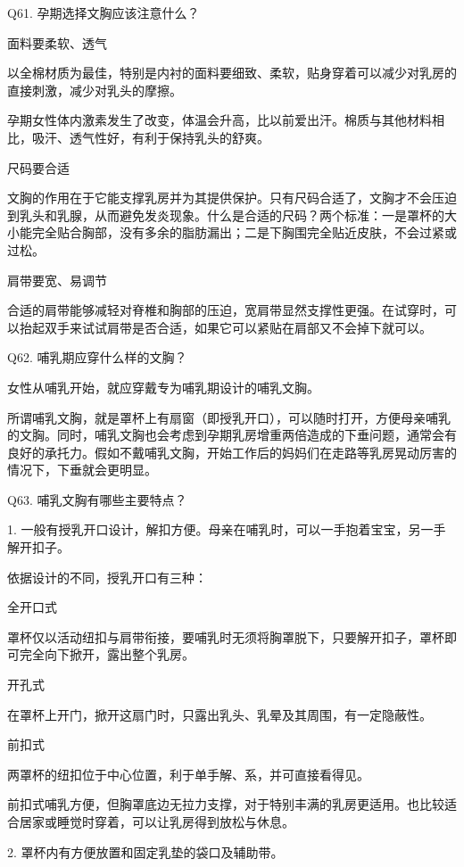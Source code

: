\documentclass[12pt,UTF8]{ctexbook}
\begin{document}
Q61. 孕期选择文胸应该注意什么？


面料要柔软、透气

以全棉材质为最佳，特别是内衬的面料要细致、柔软，贴身穿着可以减少对乳房的直接刺激，减少对乳头的摩擦。

孕期女性体内激素发生了改变，体温会升高，比以前爱出汗。棉质与其他材料相比，吸汗、透气性好，有利于保持乳头的舒爽。

尺码要合适

文胸的作用在于它能支撑乳房并为其提供保护。只有尺码合适了，文胸才不会压迫到乳头和乳腺，从而避免发炎现象。什么是合适的尺码？两个标准：一是罩杯的大小能完全贴合胸部，没有多余的脂肪漏出；二是下胸围完全贴近皮肤，不会过紧或过松。

肩带要宽、易调节

合适的肩带能够减轻对脊椎和胸部的压迫，宽肩带显然支撑性更强。在试穿时，可以抬起双手来试试肩带是否合适，如果它可以紧贴在肩部又不会掉下就可以。





Q62. 哺乳期应穿什么样的文胸？


女性从哺乳开始，就应穿戴专为哺乳期设计的哺乳文胸。



所谓哺乳文胸，就是罩杯上有扇窗（即授乳开口），可以随时打开，方便母亲哺乳的文胸。同时，哺乳文胸也会考虑到孕期乳房增重两倍造成的下垂问题，通常会有良好的承托力。假如不戴哺乳文胸，开始工作后的妈妈们在走路等乳房晃动厉害的情况下，下垂就会更明显。





Q63. 哺乳文胸有哪些主要特点？


1. 一般有授乳开口设计，解扣方便。母亲在哺乳时，可以一手抱着宝宝，另一手解开扣子。


依据设计的不同，授乳开口有三种：

全开口式

罩杯仅以活动纽扣与肩带衔接，要哺乳时无须将胸罩脱下，只要解开扣子，罩杯即可完全向下掀开，露出整个乳房。

开孔式

在罩杯上开门，掀开这扇门时，只露出乳头、乳晕及其周围，有一定隐蔽性。

前扣式

两罩杯的纽扣位于中心位置，利于单手解、系，并可直接看得见。

前扣式哺乳方便，但胸罩底边无拉力支撑，对于特别丰满的乳房更适用。也比较适合居家或睡觉时穿着，可以让乳房得到放松与休息。


2. 罩杯内有方便放置和固定乳垫的袋口及辅助带。
\end{document}
